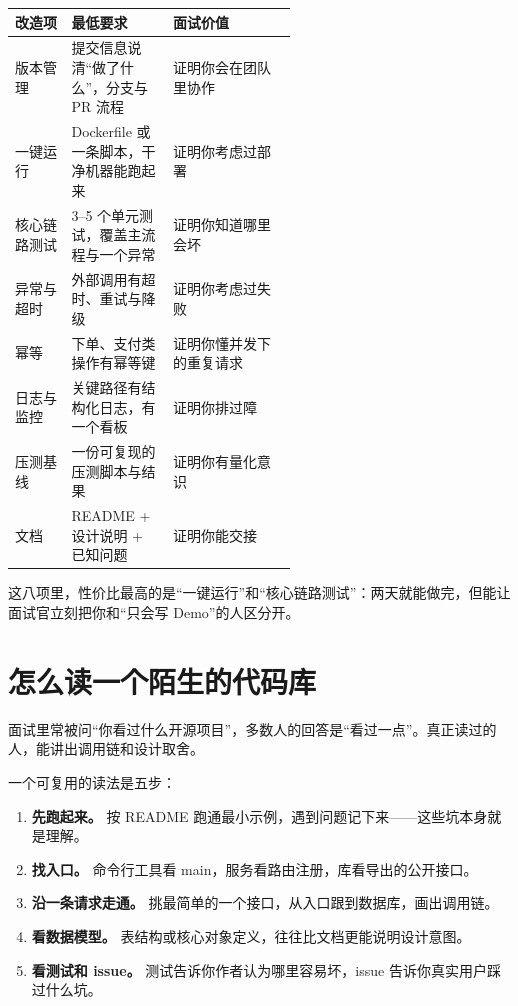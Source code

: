 \documentclass[UTF8,zihao=5,openany]{ctexbook}
\begin{document}
\begin{center}\small
\begin{tabularx}{\linewidth}{p{0.20\linewidth}p{0.36\linewidth}Y}
\toprule
改造项 & 最低要求 & 面试价值 \\
\midrule
版本管理 & 提交信息说清“做了什么”，分支与 PR 流程 & 证明你会在团队里协作 \\
一键运行 & Dockerfile 或一条脚本，干净机器能跑起来 & 证明你考虑过部署 \\
核心链路测试 & 3--5 个单元测试，覆盖主流程与一个异常 & 证明你知道哪里会坏 \\
异常与超时 & 外部调用有超时、重试与降级 & 证明你考虑过失败 \\
幂等 & 下单、支付类操作有幂等键 & 证明你懂并发下的重复请求 \\
日志与监控 & 关键路径有结构化日志，有一个看板 & 证明你排过障 \\
压测基线 & 一份可复现的压测脚本与结果 & 证明你有量化意识 \\
文档 & README + 设计说明 + 已知问题 & 证明你能交接 \\
\bottomrule
\end{tabularx}
\end{center}

这八项里，性价比最高的是“一键运行”和“核心链路测试”：两天就能做完，但能让面试官立刻把你和“只会写 Demo”的人区分开。

\section{怎么读一个陌生的代码库}
面试里常被问“你看过什么开源项目”，多数人的回答是“看过一点”。真正读过的人，能讲出调用链和设计取舍。

一个可复用的读法是五步：

\begin{enumerate}
\item \textbf{先跑起来。} 按 README 跑通最小示例，遇到问题记下来——这些坑本身就是理解。
\item \textbf{找入口。} 命令行工具看 main，服务看路由注册，库看导出的公开接口。
\item \textbf{沿一条请求走通。} 挑最简单的一个接口，从入口跟到数据库，画出调用链。
\item \textbf{看数据模型。} 表结构或核心对象定义，往往比文档更能说明设计意图。
\item \textbf{看测试和 issue。} 测试告诉你作者认为哪里容易坏，issue 告诉你真实用户踩过什么坑。
\end{enumerate}
\end{document}
